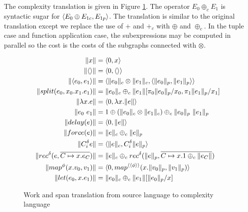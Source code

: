 %
The complexity translation is given in Figure
\ref{fig:ws_complexity_translation}.  The operator $E_0 \oplus_c E_1$ is
syntactic sugar for $\langle E_0 \oplus E_{1c}, E_{1p} \rangle$.  The
translation is similar to the original translation except we replace the use of
$+$ and $+_c$ with $\oplus$ and $\oplus_c$.  In the tuple case and function
application case, the subexpressions may be computed in parallel so the cost is
the costs of the subgraphs connected with $\otimes$.
%
\begin{figure}
  \label{fig:ws_complexity_translation}
  \caption{Work and span translation from source language to complexity language}
  \begin{align*}
    \|x\| &= \langle 0, x \rangle \\
    \|\langle\rangle\| &= \langle 0, \langle \rangle \rangle \\
    \|\langle e_0, e_1 \rangle \| &= \langle \|e_0\|_c \otimes \|e_1\|_c, \langle \|e_0\|_p, \|e_1\|_p\rangle\rangle \\
    \|split(e_0, x_0.x_1.e_1)\| &= \|e_0\|_c \oplus_c \|e_1\|[\pi_0\|e_0\|_p/x_0, \pi_1\|e_1\|_p/x_1] \\
    \|\lambda x.e\| &= \langle 0, \lambda x.\|e\| \rangle \\
    \|e_0\ e_1\| &= 1 \oplus (\|e_0\|_c \otimes \|e_1\|_c) \oplus_c \|e_0\|_p\ \|e_1\|_p \\
    \|delay(e)\| &= \langle 0, \|e\|\rangle \\
    \|force(e)\| &= \|e\|_c \oplus_c \|e\|_p \\
    \|C_i^\delta e\| &= \langle \|e\|_c, C_i^\delta \|e\|_p \rangle \\
    \|rec^\delta(e, \overline{C \mapsto x.e_C})\| &= \|e\|_c \oplus_c rec^\delta(\|e\|_p, \overline{C \mapsto x.1 \oplus_c \|e_C\|}) \\
    \|map^\phi(x.v_0, v_1)\| &= \langle 0, map^{\langle\langle \phi \rangle \rangle} (x. \|v_0\|_p, \|v_1\|_p)\rangle \\
    \|let(e_0, x.e_1)\| &= \|e_0\|_c \oplus_c \|e_1\|[\|e_0\|_p/x]
  \end{align*}
\end{figure}
%
